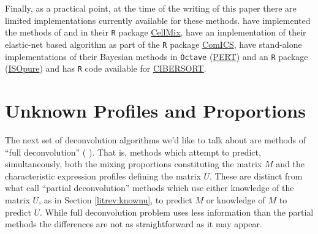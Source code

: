 \documentclass[reqno,12pt,oneside]{report}\usepackage[]{graphicx}\usepackage[]{color}
\renewcommand{\citet}[1]{(\citeauthor{#1} \citeyear{#1})}
\theoremstyle{plain}
\theoremstyle{definition}
\theoremstyle{remark}
\numberwithin{theorem}{chapter}     %
\begin{document}
Finally, as a practical point, at the time of the writing of this paper there are limited implementations currently available for these methods. \citeauthor{Gaujoux2013} have implemented the methods of \citeauthor{Abbas2009} and \citeauthor{Gong2011} in their \verb+R+ package \href{http://web.cbio.uct.ac.za/~renaud/CRAN/web/CellMix/}{CellMix}, \citeauthor{Altboum2014} have an implementation of their elastic-net based algorithm as part of the \verb+R+ package \href{https://cran.r-project.org/web/packages/ComICS/index.html}{ComICS}, \citeauthor{Qiao2012} have stand-alone implementations of their Bayesian methods in \verb+Octave+ (\href{https://github.com/gquon/PERT}{PERT}) and an \verb+R+ package (\href{https://cran.r-project.org/web/packages/ISOpureR/index.html}{ISOpure}) and \citeauthor{Newman2015} has \verb+R+ code available for \href{https://cibersort.stanford.edu/}{CIBERSORT}.

\section{Unknown Profiles and Proportions}
\label{litrev:full}

The next set of deconvolution algorithms we'd like to talk about are methods of ``full deconvolution'' \citet{Gaujoux2013}. That is, methods which attempt to predict, simultaneously, both the mixing proportions constituting the matrix $M$ and the characteristic expression profiles defining the matrix $U$. These are distinct from what \citeauthor{Gaujoux2013} call ``partial deconvolution'' methods which use either knowledge of the matrix $U$, as in Section \ref{litrev:knownu}, to predict $M$ or knowledge of $M$ to predict $U$. While full deconvolution problem uses less information than the partial methods the differences are not as straightforward as it may appear. 
\end{document}
